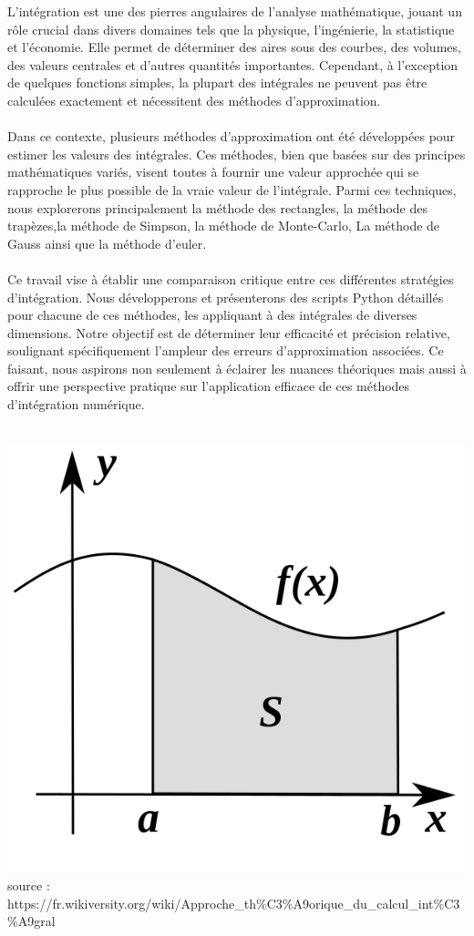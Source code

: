 \documentclass[12pt,a4paper]{article}
\begin{document}
L'intégration est une des pierres angulaires de l'analyse mathématique, jouant un rôle crucial dans divers domaines tels que la physique, l'ingénierie, la statistique et l'économie. Elle permet de déterminer des aires sous des courbes, des volumes, des valeurs centrales et d'autres quantités importantes. Cependant, à l'exception de quelques fonctions simples, la plupart des intégrales ne peuvent pas être calculées exactement et nécessitent des méthodes d'approximation.
\\
\\
Dans ce contexte, plusieurs méthodes d'approximation ont été développées pour estimer les valeurs des intégrales. Ces méthodes, bien que basées sur des principes mathématiques variés, visent toutes à fournir une valeur approchée qui se rapproche le plus possible de la vraie valeur de l'intégrale. Parmi ces techniques, nous explorerons principalement la méthode des rectangles, la méthode des trapèzes,la méthode de Simpson, la méthode de Monte-Carlo, La méthode de Gauss ainsi que la méthode d'euler.
\\
\\
Ce travail vise à établir une comparaison critique entre ces différentes stratégies d'intégration. Nous développerons et présenterons des scripts Python détaillés pour chacune de ces méthodes, les appliquant à des intégrales de diverses dimensions. Notre objectif est de déterminer leur efficacité et précision relative, soulignant spécifiquement l'ampleur des erreurs d'approximation associées. Ce faisant, nous aspirons non seulement à éclairer les nuances théoriques mais aussi à offrir une perspective pratique sur l'application efficace de ces méthodes d'intégration numérique.
\\
\\
\begin{center}
\includegraphics[scale=0.4]{600px-Integral_as_region_under_curve.svg.png}  \\
source : https://fr.wikiversity.org/wiki/Approche_th\%C3\%A9orique_du_calcul_int\%C3\%A9gral
\end{center}
\end{document}
